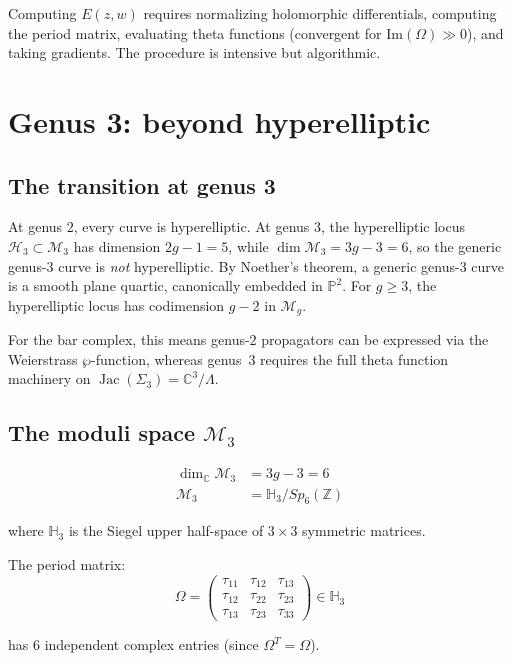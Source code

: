 \begin{remark}
\label{rem:prime-form-computation}
Computing $E(z,w)$ requires normalizing holomorphic differentials, computing the period matrix, evaluating theta functions (convergent for $\text{Im}(\Omega) \gg 0$), and taking gradients.  The procedure is intensive but algorithmic.
\end{remark}

\section{Genus 3: beyond hyperelliptic}
\label{sec:genus-3-complete}

\subsection{The transition at genus 3}

\begin{remark}
\label{rem:genus3-transition}
At genus $2$, every curve is hyperelliptic. At genus $3$, the hyperelliptic locus $\mathcal{H}_3 \subset \mathcal{M}_3$ has dimension $2g-1 = 5$, while $\dim \mathcal{M}_3 = 3g-3 = 6$, so the generic genus-$3$ curve is \emph{not} hyperelliptic. By Noether's theorem, a generic genus-$3$ curve is a smooth plane quartic, canonically embedded in $\mathbb{P}^2$. For $g \geq 3$, the hyperelliptic locus has codimension $g-2$ in $\mathcal{M}_g$.

For the bar complex, this means genus-$2$ propagators can be expressed via the Weierstrass $\wp$-function, whereas genus~$3$ requires the full theta function machinery on $\operatorname{Jac}(\Sigma_3) = \mathbb{C}^3/\Lambda$.
\end{remark}

\subsection{\texorpdfstring{The moduli space $\mathcal{M}_3$}{The moduli space M-3}}

\begin{definition}
\label{def:moduli-g3}
\begin{align}
\dim_{\mathbb{C}} \mathcal{M}_3 &= 3g - 3 = 6 \\
\mathcal{M}_3 &= \mathbb{H}_3 / Sp_6(\mathbb{Z})
\end{align}

where $\mathbb{H}_3$ is the Siegel upper half-space of $3 \times 3$ symmetric matrices.

The period matrix:
\begin{equation}
\Omega = \begin{pmatrix}
\tau_{11} & \tau_{12} & \tau_{13} \\
\tau_{12} & \tau_{22} & \tau_{23} \\
\tau_{13} & \tau_{23} & \tau_{33}
\end{pmatrix} \in \mathbb{H}_3
\end{equation}

has $6$ independent complex entries (since $\Omega^T = \Omega$).
\end{definition}


